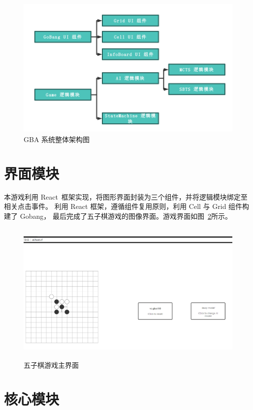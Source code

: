 \documentclass[UTF8,cs4size]{ctexart}
\begin{document}
\begin{figure}[htb]
  \centering
  \includegraphics[width=\textwidth,height=7cm]{figures/assign1_arch.png}
  \caption{GBA 系统整体架构图}
  \label{fig:arch}
\end{figure}

\clearpage

\section{界面模块}
本游戏利用 React~\cite{web:react}框架实现，将图形界面封装为三个组件，并将逻辑模块绑定至相关点击事件。
利用 React 框架，遵循组件复用原则，利用 Cell 与 Grid 组件构建了 Gobang，
最后完成了五子棋游戏的图像界面。游戏界面如图~\ref{fig:UI}所示。

\begin{figure}[htb]
  \centering
  \includegraphics[width=\textwidth,height=7cm]{figures/assign1_UI.png}
  \caption{五子棋游戏主界面}
  \label{fig:UI}
\end{figure}

\clearpage

\section{核心模块}
\end{document}
